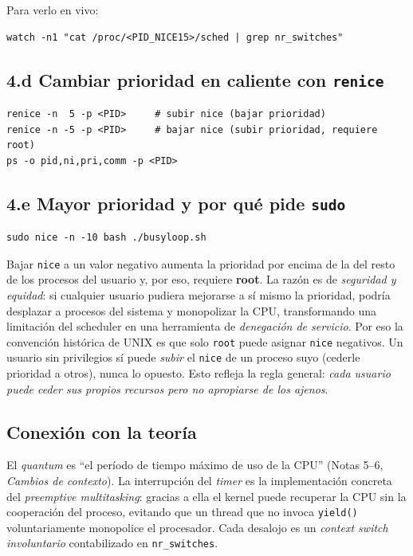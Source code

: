 \documentclass[11pt,a4paper]{article}
\begin{document}
Para verlo en vivo:

\begin{lstlisting}
watch -n1 "cat /proc/<PID_NICE15>/sched | grep nr_switches"
\end{lstlisting}

\subsection*{4.d Cambiar prioridad en caliente con \texttt{renice}}

\begin{lstlisting}
renice -n  5 -p <PID>     # subir nice (bajar prioridad)
renice -n -5 -p <PID>     # bajar nice (subir prioridad, requiere root)
ps -o pid,ni,pri,comm -p <PID>
\end{lstlisting}

\subsection*{4.e Mayor prioridad y por qué pide \texttt{sudo}}

\begin{lstlisting}
sudo nice -n -10 bash ./busyloop.sh
\end{lstlisting}

Bajar \texttt{nice} a un valor negativo aumenta la prioridad por encima
de la del resto de los procesos del usuario y, por eso, requiere
\textbf{root}. La razón es de \emph{seguridad y equidad}: si cualquier
usuario pudiera mejorarse a sí mismo la prioridad, podría desplazar a
procesos del sistema y monopolizar la CPU, transformando una limitación
del scheduler en una herramienta de \emph{denegación de servicio}. Por
eso la convención histórica de UNIX es que solo \texttt{root} puede
asignar \texttt{nice} negativos. Un usuario sin privilegios sí puede
\emph{subir} el \texttt{nice} de un proceso suyo (cederle prioridad a
otros), nunca lo opuesto. Esto refleja la regla general:
\emph{cada usuario puede ceder sus propios recursos pero no apropiarse
de los ajenos}.

\subsection*{Conexión con la teoría}

El \emph{quantum} es ``el período de tiempo máximo de uso de la CPU''
(Notas 5--6, \emph{Cambios de contexto}). La interrupción del
\emph{timer} es la implementación concreta del \emph{preemptive
multitasking}: gracias a ella el kernel puede recuperar la CPU sin la
cooperación del proceso, evitando que un thread que no invoca
\texttt{yield()} voluntariamente monopolice el procesador. Cada
desalojo es un \emph{context switch involuntario} contabilizado en
\texttt{nr\_switches}.
\end{document}
